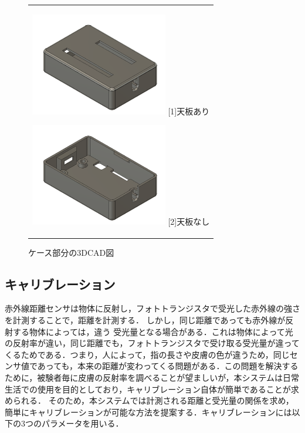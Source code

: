 \documentclass[11pt,a4paper]{jarticle}
\begin{document}
\begin{figure}[H]
  \begin{center}
    \begin{tabular}{c}

      \begin{minipage}{0.5\hsize}
        \begin{center}
          \includegraphics[clip, width=6cm]{fig/case1.png}
          \hspace{3.2cm} [1]天板あり
        \end{center}
      \end{minipage}

      \begin{minipage}{0.5\hsize}
        \begin{center}
          \includegraphics[clip, width=6cm]{fig/case2.png}
          \hspace{3.2cm} [2]天板なし
        \end{center}
      \end{minipage}


    \end{tabular}
    \caption{ケース部分の3DCAD図}
    \label{fig:case}
  \end{center}
\end{figure}


\subsection{キャリブレーション}
赤外線距離センサは物体に反射し，フォトトランジスタで受光した赤外線の強さを計測することで，距離を計測する．
しかし，同じ距離であっても赤外線が反射する物体によっては，違う
受光量となる場合がある．これは物体によって光の反射率が違い，同じ距離でも，フォトトランジスタで受け取る受光量が違ってくるためである．つまり，人によって，指の長さや皮膚の色が違うため，同じセンサ値であっても，本来の距離が変わってくる問題がある．この問題を解決するために，被験者毎に皮膚の反射率を調べることが望ましいが，本システムは日常生活での使用を目的としており，キャリブレーション自体が簡単であることが求められる．
そのため，本システムでは計測される距離と受光量の関係を求め，簡単にキャリブレーションが可能な方法を提案する．キャリブレーションには以下の3つのパラメータを用いる．
\end{document}
